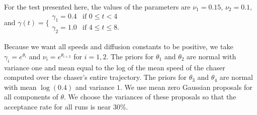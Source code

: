 \documentclass[graybox]{svmult}
\begin{document}
For the test presented here, the values of the parameters are  $\nu_1
= 0.15$, $\nu_2 = 0.1$, and $\gamma(t) =
\biggl\{
	\begin{array}{ll}
		\gamma_1 = 0.4  & \mbox{if } 0 \leq t < 4 \\
		\gamma_2 = 1.0 & \mbox{if } 4 \leq t \leq 8.
	\end{array}$

Because we want all speeds and diffusion constants to be positive, we
take $\gamma_i = e^{\theta_i}$ and $\nu_i = e^{\theta_{i+2}}$ for $i =
1, 2$.  The priors for $\theta_1$ and $\theta_2$ are normal with
variance one and mean equal to the log of the mean speed of the chaser computed over the chaser's
entire trajectory. The priors for $\theta_3$ and $\theta_4$ are normal with mean
$\log(0.4)$ and variance $1$.  We use mean zero Gaussian proposals for all
components of $\theta$.  We choose the variances of these proposals so
that the acceptance rate for all runs is near $30\%$.
\end{document}
